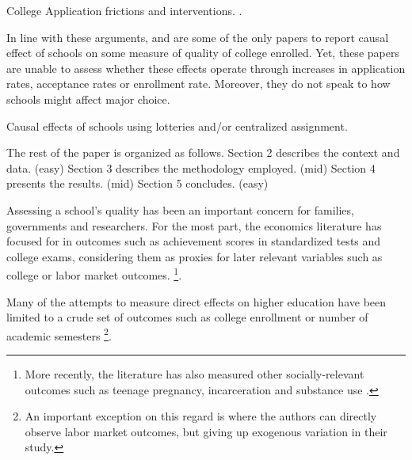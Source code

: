 \documentclass[a4paper, article, english, oneside, unknownkeysallowed, 12pt]{memoir}
\begin{document}
College Application frictions and interventions. 
\parencite{chetty_diversifying_2025,hoxby_what_2015, dynarski_closing_2021, hastings_informed_2016}.


 In line with these arguments,  \parencite{abdulkadiroglu_elite_2014} and 
\parencite{abdulkadiroglu_parents_2020} are some of the only papers to report causal effect of schools on some measure of quality of college enrolled. Yet, these papers are unable to assess whether these effects operate through increases in application rates, acceptance rates or enrollment rate. Moreover, they do not speak to how schools might affect major choice. 

Causal effects of schools using lotteries and/or centralized assignment. 
\parencite{abdulkadiroglu_research_2017}
\parencite{abdulkadiroglu_elite_2014}


The rest of the paper is organized as follows.
Section 2 describes the context and data.  (easy)
Section 3 describes the methodology employed.  (mid)
Section 4 presents the results. (mid)
Section 5 concludes. (easy)






Assessing a school's quality has been an important concern for families, governments and researchers. 
For the most part, the economics literature has focused for in outcomes such as achievement scores in  standardized tests and college exams, considering them as proxies for later relevant variables such as college or labor market outcomes. \parencite{chetty_measuring_2014}\footnote{ More recently, the literature has also measured other socially-relevant outcomes such as teenage pregnancy, incarceration and substance use \parencite{dobbie_medium-term_2015, beuermann_what_2023}.}. 

Many of the attempts to measure direct effects on higher education have been limited to a crude set of outcomes such as college enrollment or number of academic semesters \parencite{angrist_stand_2016, dobbie_medium-term_2015}\footnote{An important exception on this regard is \parencite{dobbie_charter_2020} where the authors can directly observe labor market outcomes, but giving up exogenous variation in their study.}.
\end{document}
